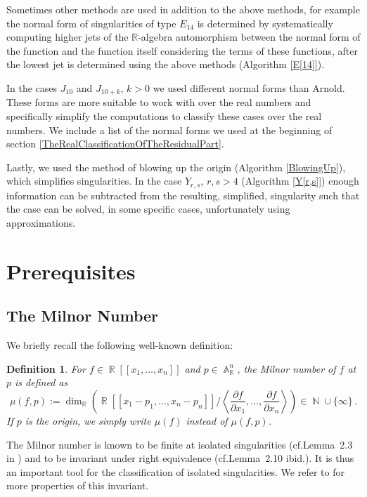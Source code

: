 \documentclass[noend]{amsproc}
\newtheorem{defn}[theorem]{Definition}
\DeclareMathOperator{\N}{\mathbb{N}}
\DeclareMathOperator{\R}{\mathbb{R}}
\DeclareMathOperator{\A}{\mathbb{A}}
\begin{document}
Sometimes other methods are used in addition to the above methods, for example
the normal form of singularities of type $E_{14}$ is determined by
systematically computing higher jets of the $\mathbb R$-algebra automorphism
between the normal form of the function and the function itself considering the
terms of these functions, after the lowest jet is determined using the above
methods (Algorithm \ref{E[14]}).

In the cases $J_{10}$ and $J_{10+k}$, $k>0$ we used different normal forms than
Arnold. These forms are more suitable to work with over the real numbers and
specifically simplify the computations to classify these cases over the real
numbers. We include a list of the normal forms we used at the beginning of
section \ref{TheRealClassificationOfTheResidualPart}.

Lastly, we used the method of blowing up the origin (Algorithm
\ref{BlowingUp}), which simplifies singularities. In the case $Y_{r,s}$,
$r,s>4$ (Algorithm \ref{Y[r,s]}) enough information can be subtracted from the
resulting, simplified, singularity such that the case can be solved, in some
specific cases, unfortunately using approximations.


\section{Prerequisites}

\subsection{The Milnor Number}

We briefly recall the following well-known definition:

\begin{defn}
For $f \in \R[[x_1,\ldots,x_n]]$ and $p \in \A_{\R}^n$, the
\emph{Milnor number} of $f$ at $p$ is defined as
\[
\mu(f, p) := \dim_{\R}
\left( \R[[x_1-p_1, \ldots, x_n-p_n]] \bigg/
\left\langle \frac{\partial f}{\partial x_1}, \ldots,
\frac{\partial f}{\partial x_n} \right\rangle \right)
\in \N \cup \{\infty\} \,.
\]
If $p$ is the origin, we simply write $\mu(f)$ instead of $\mu(f, p)$.
\end{defn}

The Milnor number is known to be finite at isolated singularities
(cf.\@ Lemma~2.3 in \cite{GLS2007}) and to be invariant under right equivalence
(cf.\@ Lemma~2.10 ibid.). It is thus an important tool for the classification
of isolated singularities. We refer to \cite{GLS2007} for more properties of
this invariant.
\end{document}
